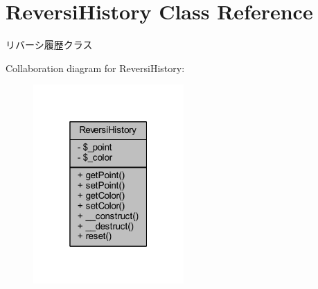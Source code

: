 \hypertarget{class_reversi_history}{}\section{Reversi\+History Class Reference}
\label{class_reversi_history}


リバーシ履歴クラス  




Collaboration diagram for Reversi\+History\+:
\nopagebreak
\begin{figure}[H]
\begin{center}
\leavevmode
\includegraphics[width=163pt]{class_reversi_history__coll__graph}
\end{center}
\end{figure}
